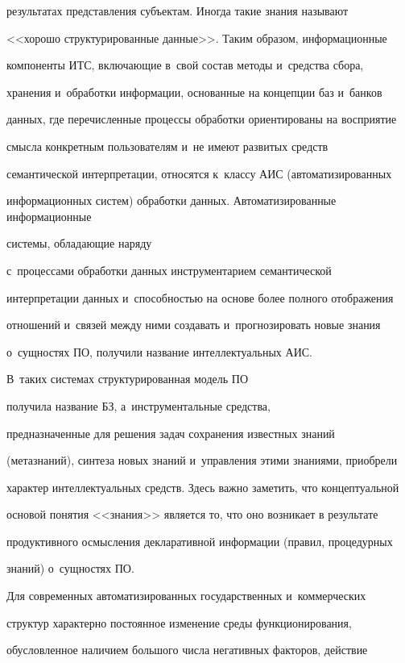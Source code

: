результатах представления субъектам. Иногда такие знания называют


<<хорошо структурированные данные>>. Таким образом, информационные


компоненты ИТС, включающие в~свой состав методы и~средства сбора,


хранения и~обработки информации, основанные на концепции баз и~банков


данных, где перечисленные процессы обработки ориентированы на восприятие


смысла конкретным пользователям и~не имеют развитых средств


семантической интерпретации, относятся к~классу АИС (автоматизированных


информационных систем) обработки данных. Автоматизированные информационные


сис\-те\-мы, обладающие наряду


с~процессами обработки данных инструментарием семантической


интерпретации данных и~способностью на основе более полного отображения


отношений и~связей между ними создавать и~прогнозировать новые знания


о~сущностях ПО, получили название интеллектуальных АИС.


В~таких системах структурированная модель ПО


получила название БЗ, а~инструментальные средства,


предназначенные для решения задач сохранения известных знаний


(метазнаний), синтеза новых знаний и~управления этими знаниями, приобрели


характер интеллектуальных средств. Здесь важно заметить, что концептуальной


основой понятия <<знания>> является то, что оно возникает в результате


продуктивного осмысления декларативной информации (правил, процедурных


знаний) о~сущностях ПО.





  Для современных автоматизированных государственных и~коммерческих


структур характерно постоянное изменение среды функционирования,


обуслов\-лен\-ное наличием большого числа негативных факторов, действие



